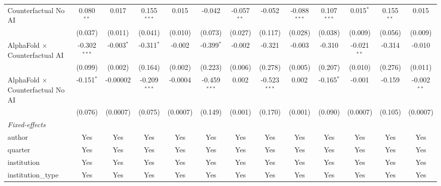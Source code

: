 \begin{tabular}{lcccccccccccc}
   Counterfactual No AI                     & 0.080$^{**}$   & 0.017        & 0.155$^{***}$  & 0.015        & -0.042         & -0.057$^{**}$ & -0.052         & -0.088$^{***}$ & 0.107$^{***}$ & 0.015$^{*}$   & 0.155$^{**}$ & 0.015\\   
                                            & (0.037)        & (0.011)      & (0.041)        & (0.010)      & (0.073)        & (0.027)       & (0.117)        & (0.028)        & (0.038)       & (0.009)       & (0.056)      & (0.009)\\   
   AlphaFold $\times$ Counterfactual AI     & -0.302$^{***}$ & -0.003$^{*}$ & -0.311$^{*}$   & -0.002       & -0.399$^{*}$   & -0.002        & -0.321         & -0.003         & -0.310        & -0.021$^{**}$ & -0.314       & -0.010\\   
                                            & (0.099)        & (0.002)      & (0.164)        & (0.002)      & (0.223)        & (0.006)       & (0.278)        & (0.005)        & (0.207)       & (0.010)       & (0.276)      & (0.011)\\   
   AlphaFold $\times$ Counterfactual No AI  & -0.151$^{*}$   & -0.00002     & -0.209$^{***}$ & -0.0004      & -0.459$^{***}$ & 0.002         & -0.523$^{***}$ & 0.002          & -0.165$^{*}$  & -0.001        & -0.159       & -0.002$^{**}$\\   
                                            & (0.076)        & (0.0007)     & (0.075)        & (0.0007)     & (0.149)        & (0.001)       & (0.170)        & (0.001)        & (0.090)       & (0.0007)      & (0.105)      & (0.0007)\\   
   \midrule
   \emph{Fixed-effects}\\
   author                                   & Yes            & Yes          & Yes            & Yes          & Yes            & Yes           & Yes            & Yes            & Yes           & Yes           & Yes          & Yes\\  
   quarter                                  & Yes            & Yes          & Yes            & Yes          & Yes            & Yes           & Yes            & Yes            & Yes           & Yes           & Yes          & Yes\\  
   institution                              & Yes            & Yes          & Yes            & Yes          & Yes            & Yes           & Yes            & Yes            & Yes           & Yes           & Yes          & Yes\\  
   institution\_type                        & Yes            & Yes          & Yes            & Yes          & Yes            & Yes           & Yes            & Yes            & Yes           & Yes           & Yes          & Yes\\  

\end{tabular}
